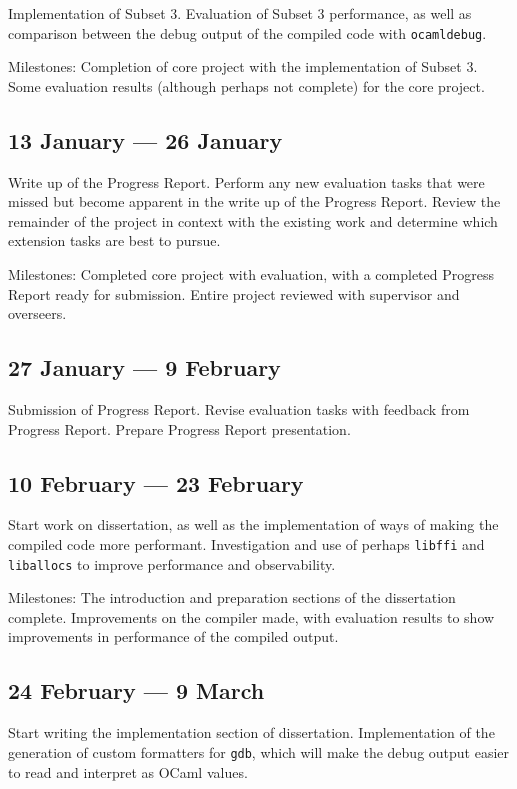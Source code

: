 Implementation of Subset 3. Evaluation of Subset 3 performance, as well as
comparison between the debug output of the compiled code with
\texttt{ocamldebug}.

Milestones: Completion of core project with the implementation of Subset 3.
Some evaluation results (although perhaps not complete) for the core project.

\subsection*{13 January --- 26 January}

Write up of the Progress Report. Perform any new evaluation tasks that were
missed but become apparent in the write up of the Progress Report. Review the
remainder of the project in context with the existing work and determine which
extension tasks are best to pursue.

Milestones: Completed core project with evaluation, with a completed Progress
Report ready for submission. Entire project reviewed with supervisor and
overseers.

\subsection*{27 January --- 9 February}

Submission of Progress Report. Revise evaluation tasks with feedback from
Progress Report. Prepare Progress Report presentation.

\subsection*{10 February --- 23 February}

Start work on dissertation, as well as the implementation of ways of making the
compiled code more performant. Investigation and use of perhaps \texttt{libffi}
and \texttt{liballocs} to improve performance and observability.

Milestones: The introduction and preparation sections of the dissertation
complete. Improvements on the compiler made, with evaluation results to show
improvements in performance of the compiled output.

\subsection*{24 February --- 9 March}

Start writing the implementation section of dissertation. Implementation of the
generation of custom formatters for \texttt{gdb}, which will make the debug
output easier to read and interpret as OCaml values.

